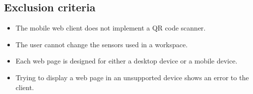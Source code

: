 \subsection{Exclusion criteria}
\begin{itemize}
    \item The mobile web client does not implement a QR code scanner.
    \item The user cannot change the sensors used in a workspace.
    \item Each web page is designed for either a desktop device or a mobile device.
    \item Trying to display a web page in an unsupported device shows an error to the client.
\end{itemize}
